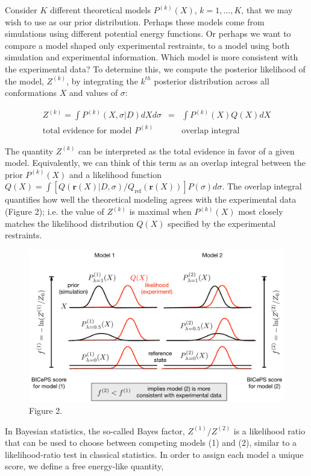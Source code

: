 Consider \(K\) different theoretical models \(P^{(k)}(X)\),
\(k=1,...,K\), that we may wish to use as our prior distribution.
Perhaps these models come from simulations using different potential
energy functions. Or perhaps we want to compare a model shaped only
experimental restraints, to a model using both simulation and
experimental information. Which model is more consistent with the
experimental data? To determine this, we compute the posterior
likelihood of the model, \(Z^{(k)}\), by integrating the \(k^{th}\)
posterior distribution across all conformations \(X\) and values of
\(\sigma\):

\[\begin{aligned}
Z^{(k)} = \int P^{(k)}(X,\sigma | D)  dX d\sigma  &=& \int P^{(k)}(X) Q(X) dX\\
 \text{total evidence for model } P^{(k)} && \text{overlap integral}
\end{aligned}\]

The quantity \(Z^{(k)}\) can be interpreted as the total evidence in
favor of a given model. Equivalently, we can think of this term as an
overlap integral between the prior \(P^{(k)}(X)\) and a likelihood
function
\(Q(X) = \int [Q(\mathbf{r}(X)|D,\sigma)/Q_{\text{ref}}(\mathbf{r}(X)) ] P(\sigma) d\sigma\).
The overlap integral quantifies how well the theoretical modeling agrees
with the experimental data (Figure 2); i.e. the value of \(Z^{(k)}\) is
maximal when \(P^{(k)}(X)\) most closely matches the likelihood
distribution \(Q(X)\) specified by the experimental restraints.

\begin{figure}
\centering
\includegraphics{figures/Figure2.pdf}
\caption{Figure 2.}
\end{figure}

In Bayesian statistics, the so-called Bayes factor, \(Z^{(1)}/Z^{(2)}\)
is a likelihood ratio that can be used to choose between competing
models (1) and (2), similar to a likelihood-ratio test in classical
statistics. In order to assign each model a unique score, we define a
free energy-like quantity,

